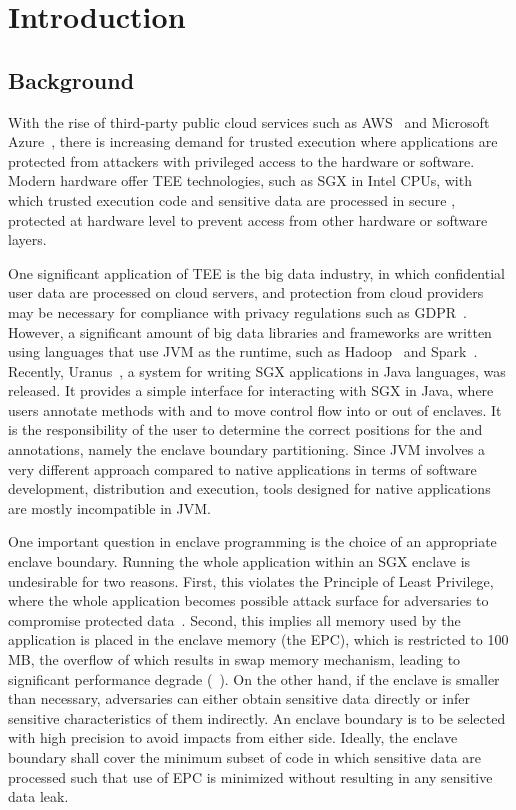 \section{Introduction}\label{sec:introduction}
\subsection{Background}\label{subsec:background}
With the rise of third-party public cloud services
such as \ac{AWS}~\cite{aws} and Microsoft Azure~\cite{azure},
there is increasing demand for trusted execution where
applications are protected from
attackers with privileged access to the hardware or software.
Modern hardware offer \ac{TEE} technologies,
such as \ac{SGX} in Intel CPUs,
with which trusted execution code and sensitive data
are processed in secure ,
protected at hardware level to prevent access
from other hardware or software layers.

One significant application of \ac{TEE} is the big data industry,
in which confidential user data are processed on cloud servers,
and protection from cloud providers may be necessary
for compliance with privacy regulations such as GDPR~\cite{gdpr}.
However, a significant amount of big data libraries and frameworks are written
using languages that use \ac{JVM} as the runtime,
such as Hadoop~\cite{apachehadoop} and Spark~\cite{apachespark}.
Recently, Uranus~\cite{uranus}, a system for
writing \ac{SGX} applications in Java languages, was released.
It provides a simple interface for interacting with \ac{SGX} in Java,
where users annotate methods with  and 
to move control flow into or out of enclaves.
It is the responsibility of the user to determine the correct positions
for the  and  annotations,
namely the enclave boundary partitioning.
Since \ac{JVM} involves a very different approach compared to native applications
in terms of software development, distribution and execution,
tools designed for native applications are mostly incompatible in \ac{JVM}.

One important question in enclave programming is the choice of an appropriate enclave boundary.
Running the whole application within an \ac{SGX} enclave is undesirable for two reasons.
First, this violates the Principle of Least Privilege,
where the whole application becomes possible attack surface
for adversaries to compromise protected data~\cite{glamdring}.
Second, this implies all memory used by the application
is placed in the enclave memory (the \ac{EPC}),
which is restricted to 100 MB,
the overflow of which results in swap memory mechanism,
leading to significant performance degrade
(~\cite{uranus}).
On the other hand, if the enclave is smaller than necessary,
adversaries can either obtain sensitive data directly or
infer sensitive characteristics of them indirectly.
An enclave boundary is to be selected with high precision to avoid impacts from either side.
Ideally, the enclave boundary shall cover the minimum subset of code
in which sensitive data are processed
such that use of \ac{EPC} is minimized
without resulting in any sensitive data leak.

